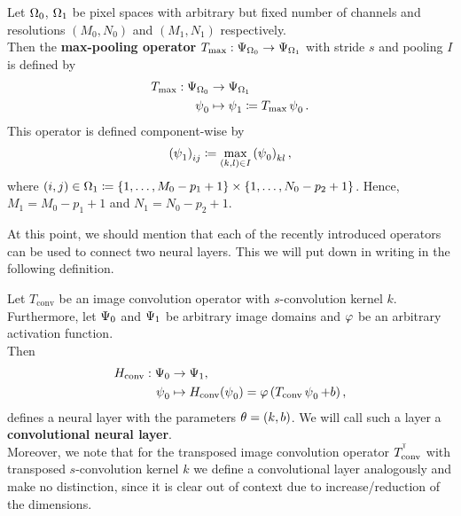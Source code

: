 \begin{definition}\label{def:max_pooling_op}
Let $\O_0$, $\O_1$ be pixel spaces with arbitrary but fixed number of channels and resolutions $(M_0,N_0)$ and $(M_1,N_1)$ respectively.\\
Then the \textbf{max-pooling operator} $T_{\text{max}}: \P_{\O_0} \to \P_{\O_1}$ with stride $s$ and pooling $I$ is defined by
\begin{align*}
T_{\text{max}}: \P_{\O_0} &\to \P_{\O_1} \\
\p_0 &\mapsto \p_1 \coloneqq T_{\text{max}}\p_0 .
\end{align*}
This operator is defined component-wise by
\begin{align}
\left(\p_1\right)_{ij} \coloneqq  \max_{(k,l)\in I} \left(\p_0\right)_{kl},
\end{align}
where $(i,j) \in \O_1 \coloneqq \{1,\ldots, M_0-p_1+1\} \times \{1,\ldots, N_0-p_2+1\}$. Hence, $M_1 = M_0-p_1+1$ and $N_1 = N_0-p_2+1$.
\end{definition}

At this point, we should mention that each of the recently introduced operators can be used to connect two neural layers. This we will put down in writing in the following definition.

\begin{definition}\label{def:convolutional_layer}
Let $T_{\text{conv}}$ be an image convolution operator with $s$-convolution kernel $k$. Furthermore, let $\P_0$ and $\P_1$ be arbitrary image domains and $\f$ be an arbitrary activation function.\\
Then
\begin{align*}
H_{\text{conv}}: \P_0 &\to \P_1,\\
\p_0 &\mapsto H_{\text{conv}} (\p_0) = \f \left(T_{\text{conv}} \p_0 + b \right),
\end{align*}
defines a neural layer with the parameters $\t = (k, b)$. We will call such a layer a \textbf{convolutional neural layer}.\\
Moreover, we note that for the transposed image convolution operator $T_{\text{conv}}^{\tran}$ with transposed $s$-convolution kernel $k$ we define a convolutional layer analogously and make no distinction, since it is clear out of context due to increase/reduction of the dimensions.
\end{definition}
